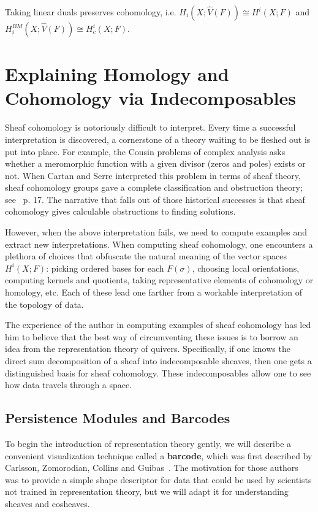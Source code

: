 \begin{lem}
 Taking linear duals preserves cohomology, i.e. $H_i(X;\widehat{V}(F))\cong H^i(X;F)$ and $H_i^{BM}(X;\widehat{V}(F))\cong H^i_c(X;F)$.
\end{lem}

\section{Explaining Homology and Cohomology via Indecomposables}
\label{subsec:rep_thy}

Sheaf cohomology is notoriously difficult to interpret. Every time a successful interpretation is discovered, a cornerstone of a theory waiting to be fleshed out is put into place. For example, the Cousin problems of complex analysis asks whether a meromorphic function with a given divisor (zeros and poles) exists or not. When Cartan and Serre interpreted this problem in terms of sheaf theory, sheaf cohomology groups gave a complete classification and obstruction theory; see~\cite{gray} p. 17. The narrative that falls out of those historical successes is that sheaf cohomology gives calculable obstructions to finding solutions.

However, when the above interpretation fails, we need to compute examples and extract new interpretations. When computing sheaf cohomology, one encounters a plethora of choices that obfuscate the natural meaning of the vector spaces $H^i(X;F)$: picking ordered bases for each $F(\sigma)$, choosing local orientations, computing kernels and quotients, taking representative elements of cohomology or homology, etc. Each of these lead one farther from a workable interpretation of the topology of data.

The experience of the author in computing examples of sheaf cohomology has led him to believe that the best way of circumventing these issues is to borrow an idea from the representation theory of quivers. Specifically, if one knows the direct sum decomposition of a sheaf into indecomposable sheaves, then one gets a distinguished basis for sheaf cohomology. These indecomposables allow one to see how data travels through a space.

\subsection{Persistence Modules and Barcodes}
\label{subsubsec:barcodes}

To begin the introduction of representation theory gently, we will describe a convenient visualization technique called a \textbf{barcode}, which was first described by Carlsson, Zomorodian, Collins and Guibas~\cite{carlsson2004persistence}. The motivation for those authors was to provide a simple shape descriptor for data that could be used by scientists not trained in representation theory, but we will adapt it for understanding sheaves and cosheaves. 

